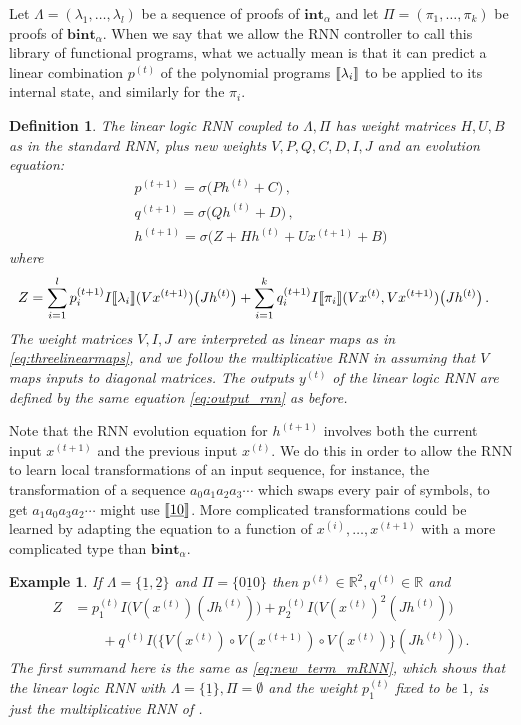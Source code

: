\documentclass[english,letter paper,12pt,leqno]{article}
\theoremstyle{example}
\newtheorem{definition}[theorem]{Definition}
\newtheorem{example}[theorem]{Example}
\numberwithin{equation}{section}
\begin{document}
Let $\Lambda = (\lambda_1,\ldots,\lambda_l)$ be a sequence of proofs of $\textbf{int}_\alpha$ and let $\Pi = (\pi_1,\ldots,\pi_k)$ be proofs of $\textbf{bint}_\alpha$. When we say that we allow the RNN controller to call this library of functional programs, what we actually mean is that it can predict a linear combination $p^{(t)}$ of the polynomial programs $\llbracket \lambda_i \rrbracket$ to be applied to its internal state, and similarly for the $\pi_i$.

\begin{definition} The \emph{linear logic} RNN coupled to $\Lambda, \Pi$ has weight matrices $H,U,B$ as in the standard RNN, plus new weights $V, P, Q, C, D, I, J$ and an evolution equation:
\begin{gather*}
p^{(t+1)} = \sigma\big( P h^{(t)} + C \big)\,,\\
q^{(t+1)} = \sigma\big( Q h^{(t)} + D \big)\,,\\
h^{(t+1)} = \sigma\Big( Z + H h^{(t)} + U x^{(t+1)} + B\Big)
\end{gather*}
where
\begin{align*}
Z &= \sum_{i=1}^l p^{(t+1)}_i I\llbracket \lambda_i \rrbracket( Vx^{(t+1)} )\big( Jh^{(t)} \big) + \sum_{i=1}^k q^{(t+1)}_i I\llbracket \pi_i \rrbracket( Vx^{(t)}, Vx^{(t+1)})\big( Jh^{(t)} \big)\,.
\end{align*}
The weight matrices $V,I,J$ are interpreted as linear maps as in \eqref{eq:threelinearmaps}, and we follow the multiplicative RNN in assuming that $V$ maps inputs to diagonal matrices. The outputs $y^{(t)}$ of the linear logic RNN are defined by the same equation \eqref{eq:output_rnn} as before.
\end{definition}

Note that the RNN evolution equation for $h^{(t+1)}$ involves both the current input $x^{(t+1)}$ and the previous input $x^{(t)}$. We do this in order to allow the RNN to learn local transformations of an input sequence, for instance, the transformation of a sequence $a_0 a_1 a_2 a_3 \cdots$ which swaps every pair of symbols, to get $a_1 a_0 a_3 a_2 \cdots$ might use $\llbracket \underline{10} \rrbracket$. More complicated transformations could be learned by adapting the equation to a function of $x^{(i)}, \ldots, x^{(t+1)}$ with a more complicated type than $\textbf{bint}_\alpha$.

\begin{example} If $\Lambda = \{ \underline{1}, \underline{2} \}$ and $\Pi = \{ \underline{010} \}$ then $p^{(t)} \in \mathbb{R}^2, q^{(t)} \in \mathbb{R}$ and
\begin{align*}
Z &= p_1^{(t)} I\big( V(x^{(t)})( Jh^{(t)}) \big) + p_2^{(t)} I\big( V(x^{(t)})^2(J h^{(t)}) \big)\\
&\qquad + q^{(t)} I\Big( \big\{ V(x^{(t)}) \circ V(x^{(t+1)}) \circ V(x^{(t)}) \big\}( J h^{(t)}) \Big)\,.
\end{align*}
The first summand here is the same as \eqref{eq:new_term_mRNN}, which shows that the linear logic RNN with $\Lambda = \{ \underline{1} \}, \Pi = \emptyset$ and the weight $p^{(t)}_1$ fixed to be $1$, is just the multiplicative RNN of \cite{sutskever}.
\end{example}
\end{document}
